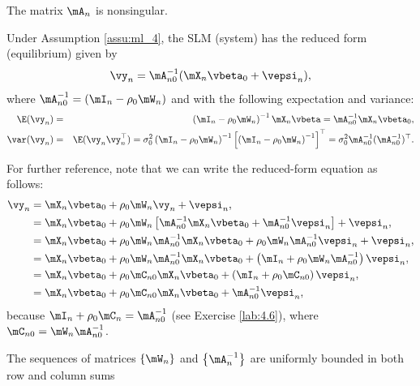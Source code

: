 \documentclass[english,12pt]{book}\usepackage[]{graphicx}\usepackage[]{xcolor}
\begin{document}
\begin{assumption}\label{assu:ml_4}
	The matrix $\mA_n$ is nonsingular.
\end{assumption}

Under Assumption \ref{assu:ml_4}, the SLM (system) has the reduced form (equilibrium) given by
\begin{equation*}
\vy_n = \mA^{-1}_{n0}(\mX_n\vbeta_0 + \vepsi_n),
\end{equation*}
%
where $\mA^{-1}_{n0} = (\mI_n - \rho_0\mW_n)$ and with the following expectation and variance:
\begin{eqnarray*}
\E(\vy_n)   &=& \left(\mI_n - \rho_0\mW_n\right)^{-1}\mX_n\vbeta  = \mA_{n0}^{-1}\mX_n\vbeta_0,\\
\var(\vy_n) &=& \E(\vy_n\vy_n^\top) = \sigma^2_{0}\left(\mI_n - \rho_0\mW_n\right)^{-1}\left[\left(\mI_n - \rho_0\mW_n\right)^{-1}\right]^\top = \sigma^2_0\mA_{n0}^{-1}(\mA_{n0}^{-1})^\top.
\end{eqnarray*}

For further reference, note that we can write the reduced-form equation as follows:
\begin{equation*}
	\begin{aligned}
	\vy_n & = \mX_n\vbeta_0 + \rho_0\mW_n\vy_n + \vepsi_n, \\
	      & = \mX_n\vbeta_0 + \rho_0\mW_n\left[\mA^{-1}_{n0}\mX_n\vbeta_0 + \mA^{-1}_{n0}\vepsi_n\right] + \vepsi_n, \\
	      & = \mX_n\vbeta_0 + \rho_0\mW_n\mA^{-1}_{n0}\mX_n\vbeta_0 + \rho_0\mW_n\mA^{-1}_{n0}\vepsi_n + \vepsi_n, \\
	      & = \mX_n\vbeta_0 + \rho_0\mW_n\mA^{-1}_{n0}\mX_n\vbeta_0  + \left(\mI_n + \rho_0\mW_n\mA^{-1}_{n0}\right)\vepsi_n, \\
	      & = \mX_n\vbeta_0 + \rho_0\mC_{n0}\mX_n\vbeta_0  + \left(\mI_n + \rho_0\mC_{n0}\right)\vepsi_n, \\
	      & = \mX_n\vbeta_0 + \rho_0\mC_{n0}\mX_n\vbeta_0  +\mA_{n0}^{-1}\vepsi_n,
	\end{aligned}
\end{equation*}
%
because $\mI_n + \rho_0\mC_n = \mA_{n0}^{-1}$ (see Exercise  \ref{lab:4.6}), where $\mC_{n0}=\mW_n\mA_{n0}^{-1}$. 

\begin{assumption}\label{assu:ml_5}
	The sequences of matrices $\left\lbrace \mW_n \right\rbrace$ and $\left\lbrace \mA_n^{-1} \right\rbrace$ are uniformly bounded in both row and column sums 
\end{assumption}
\end{document}
